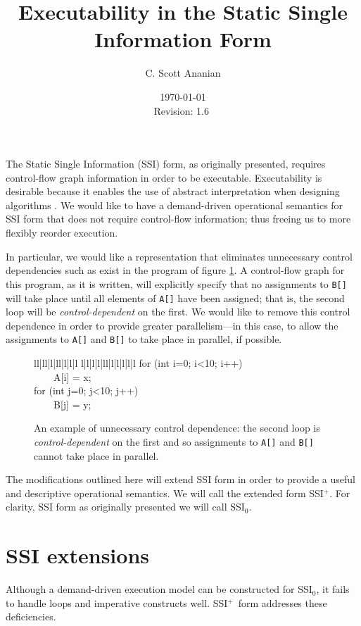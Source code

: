 \documentclass[12pt,notitlepage,twoside]{article}
\title{Executability in the Static Single Information Form}
\author{C. Scott Ananian}
\date{\today \\ $ $Revision: 1.6 $ $}
\newenvironment{samplecode}[1][1]
  {\setlength{\tabcolsep}{2\tabcolsep}%
\renewcommand{\>}{~~~~}%
\newcommand{\comment}[1]{\rm\it // ##1}%
\newcommand{\com}[1]{\comment{##1}}%
\newcommand{\ells}[1]{\ifcase#1\or l\or l|l\or l|l|l\or l|l|l|l\or
l|l|l|l|l\or l|l|l|l|l|l\fi}%
\begin{center}\tt\begin{tabular}{\ells{#1}}}
  {\end{tabular}\end{center}}
\newcommand{\ssizero}{SSI$_0$}
\newcommand{\ssiplus}{SSI$^+$}
\begin{document}


\maketitle

The Static Single Information (SSI) form, as originally presented,
requires control-flow graph information in order to be executable.
Executability is desirable because it enables the use of abstract
interpretation when designing algorithms \cite{pingali90:dfg}.  We
would like to have a demand-driven operational semantics for SSI form
that does not require control-flow information; thus freeing us to
more flexibly reorder execution.

In particular, we would like a representation that eliminates
unnecessary control dependencies such as exist in the program of
figure \ref{fig:ctrldep}.  A control-flow graph for this program, as
it is written, will explicitly specify that no assignments to
\texttt{B[]} will take place until all elements of \texttt{A[]} have
been assigned; that is, the second loop will be
\emph{control-dependent} on the first.  We would like to remove this
control dependence in order to provide greater parallelism---in this
case, to allow the assignments to \texttt{A[]} and \texttt{B[]} to
take place in parallel, if possible.

\begin{figure}[t]
\begin{samplecode}
for (int i=0; i<10; i++)\\
\>A[i] = x;\\
for (int j=0; j<10; j++)\\
\>B[j] = y;\\
\end{samplecode}
\caption{An example of unnecessary control dependence: the second loop
is \emph{control-dependent} on the first and so assignments to
\texttt{A[]} and \texttt{B[]} cannot take place in parallel.}
\label{fig:ctrldep}
\end{figure}

The modifications outlined here will extend SSI form in order to
provide a useful and descriptive operational semantics.  We will call
the extended form \ssiplus.  For clarity, SSI form as originally
presented we will call \ssizero.

\section{SSI extensions}
Although a demand-driven execution model can be constructed for
\ssizero,  it fails to handle loops and imperative
constructs well. \ssiplus\ form addresses these deficiencies.
\end{document}

